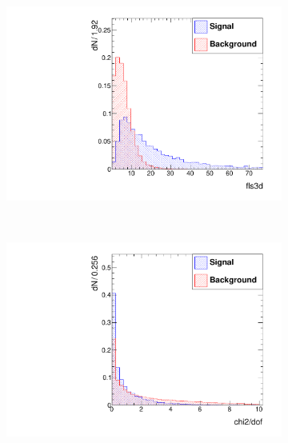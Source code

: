 \documentclass[10pt,a4paper]{article}
\begin{document}
\begin{figure}
\begin{subfigure}[b]{0.2\textwidth}
                \label{fig:etaBarrel}
        \end{subfigure}
        ~
        \begin{subfigure}[b]{0.2\textwidth}
                \centering
                \includegraphics[width=\textwidth]{Figures/fls3d_barrel}
                \label{fig:fls3dBarrel}
        \end{subfigure}
        ~
        \begin{subfigure}[b]{0.2\textwidth}
                \centering
                \includegraphics[width=\textwidth]{Figures/chi2dof_barrel}
                \label{fig:chi2dofBarrel}
        \end{subfigure}
        

\end{figure}
\end{document}
